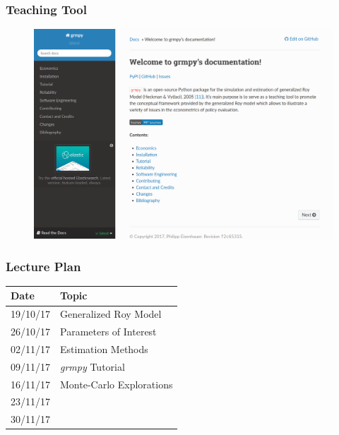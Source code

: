 \begin{frame}
\frametitle{Teaching Tool}

\begin{figure}[htp]\centering
	\includegraphics[width=\textwidth]{./material/fig-online-documentation.png}
\end{figure}

\end{frame}
    


\begin{frame}
\frametitle{Lecture Plan}
\begin{longtable}[]{@{}ll@{}}
\toprule
Date & Topic\tabularnewline
\midrule
\endhead
19/10/17 & Generalized Roy Model\tabularnewline
26/10/17 & Parameters of Interest\tabularnewline
02/11/17 & Estimation Methods\tabularnewline
09/11/17 & \emph{grmpy} Tutorial\tabularnewline
16/11/17 & Monte-Carlo Explorations\tabularnewline
23/11/17 &\tabularnewline
30/11/17 &\tabularnewline
\bottomrule
\end{longtable}
    
\end{frame}


    
